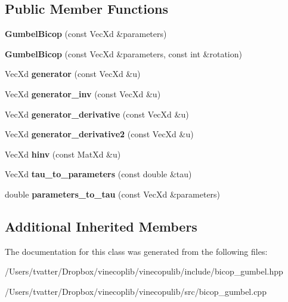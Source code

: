 \subsection*{Public Member Functions}
\begin{DoxyCompactItemize}
\item 
\mbox{\label{class_gumbel_bicop_a96f6d7548161eefbc68999d52095eef3}} 
{\bfseries Gumbel\+Bicop} (const Vec\+Xd \&parameters)
\item 
\mbox{\label{class_gumbel_bicop_a54f07cbf2630e03ddb81cbb1a07bbe9f}} 
{\bfseries Gumbel\+Bicop} (const Vec\+Xd \&parameters, const int \&rotation)
\item 
\mbox{\label{class_gumbel_bicop_a7462d2e917ed8f9c7c768bc763062000}} 
Vec\+Xd {\bfseries generator} (const Vec\+Xd \&u)
\item 
\mbox{\label{class_gumbel_bicop_a1aac5fc1926ebb1a7a5477fea8eafc4e}} 
Vec\+Xd {\bfseries generator\+\_\+inv} (const Vec\+Xd \&u)
\item 
\mbox{\label{class_gumbel_bicop_a04ad137cdb969fdcb38141dd55cc08ca}} 
Vec\+Xd {\bfseries generator\+\_\+derivative} (const Vec\+Xd \&u)
\item 
\mbox{\label{class_gumbel_bicop_ab86b728ad0f0db50711e25defc39a1ad}} 
Vec\+Xd {\bfseries generator\+\_\+derivative2} (const Vec\+Xd \&u)
\item 
\mbox{\label{class_gumbel_bicop_a33500ea02a83efb50cf1d5e6f32b928a}} 
Vec\+Xd {\bfseries hinv} (const Mat\+Xd \&u)
\item 
\mbox{\label{class_gumbel_bicop_a0128ce09c2184f9b71f4b54c2790ed84}} 
Vec\+Xd {\bfseries tau\+\_\+to\+\_\+parameters} (const double \&tau)
\item 
\mbox{\label{class_gumbel_bicop_a6755267e48f12c29d943416c60e9f33f}} 
double {\bfseries parameters\+\_\+to\+\_\+tau} (const Vec\+Xd \&parameters)
\end{DoxyCompactItemize}
\subsection*{Additional Inherited Members}


The documentation for this class was generated from the following files\+:\begin{DoxyCompactItemize}
\item 
/\+Users/tvatter/\+Dropbox/vinecoplib/vinecopulib/include/bicop\+\_\+gumbel.\+hpp\item 
/\+Users/tvatter/\+Dropbox/vinecoplib/vinecopulib/src/bicop\+\_\+gumbel.\+cpp\end{DoxyCompactItemize}
